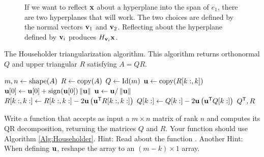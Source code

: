 \begin{figure}
\caption{If we want to reflect ${\bf x}$ about a hyperplane into the span of $e_1$, there are two hyperplanes that will work. 
The two choices are defined by the normal vectors ${\bf v}_1$ and ${\bf v}_2$. 
Reflecting about the hyperplane defined by ${\bf v}_i$ produces  $H_{{\bf v}_i}{\bf x}$.}
\label{fig:two reflectors}
\end{figure}

\begin{algorithm}
\caption{The Householder triangularization algorithm. 
This algorithm returns orthonormal $Q$ and upper triangular $R$ satisfying $A = QR$.}
\label{Alg:Householder}
\begin{algorithmic}[1]
\State $m, n \gets \mathrm{shape}(A)$
\State $R \gets \mathrm{copy}(A)$
\State $Q \gets \mathrm{Id}(m)$
    \State ${\bf u} \gets \mathrm{copy}(R[k:,k])$
    \State ${\bf u}[0] \gets {\bf u}[0] + \operatorname{sign}( {\bf u}[0] ) \left\lVert{\bf u}\right\rVert$
    \State ${\bf u} \gets {\bf u} / \left\lVert{\bf u}\right\rVert$
    \State $R[k:,k:] \gets R[k:,k:] - 2 {\bf u} \left({\bf u}^{\mathsf T} R[k:,k:] \right)$
    \State $Q[k:] \gets Q[k:] - 2 {\bf u} \left( {\bf u}^{\mathsf T} Q[k:] \right)$
\EndFor
\State {} $Q^{\mathsf T}, R$
\EndProcedure
\end{algorithmic}
\end{algorithm}


\begin{problem}
\label{prob:HouseholderQR}
Write a function that accepts as input a $m \times n$ matrix of rank $n$ and computes its QR decomposition, returning the matrices $Q$ and $R$. 
Your function should use Algorithm \ref{Alg:Householder}. 
Hint: Read about the function .  Another Hint: When defining ${\bf u}$, reshape the array to an $(m-k) \times 1$ array.
\end{problem}

